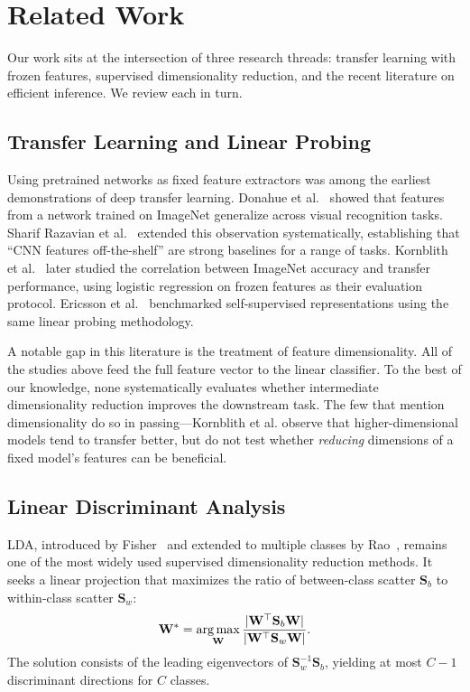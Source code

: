 \section{Related Work}
\label{sec:related_work}

Our work sits at the intersection of three research threads: transfer learning with frozen features, supervised dimensionality reduction, and the recent literature on efficient inference. We review each in turn.

\subsection{Transfer Learning and Linear Probing}

Using pretrained networks as fixed feature extractors was among the earliest demonstrations of deep transfer learning. Donahue et al.~\cite{donahue2014decaf} showed that features from a network trained on ImageNet generalize across visual recognition tasks. Sharif Razavian et al.~\cite{sharif2014cnn} extended this observation systematically, establishing that ``CNN features off-the-shelf'' are strong baselines for a range of tasks. Kornblith et al.~\cite{kornblith2019better} later studied the correlation between ImageNet accuracy and transfer performance, using logistic regression on frozen features as their evaluation protocol. Ericsson et al.~\cite{ericsson2021well} benchmarked self-supervised representations using the same linear probing methodology.

A notable gap in this literature is the treatment of feature dimensionality. All of the studies above feed the full feature vector to the linear classifier. To the best of our knowledge, none systematically evaluates whether intermediate dimensionality reduction improves the downstream task. The few that mention dimensionality do so in passing---Kornblith et al. observe that higher-dimensional models tend to transfer better, but do not test whether \emph{reducing} dimensions of a fixed model's features can be beneficial.

\subsection{Linear Discriminant Analysis}

LDA, introduced by Fisher~\cite{fisher1936lda} and extended to multiple classes by Rao~\cite{rao1948utilization}, remains one of the most widely used supervised dimensionality reduction methods. It seeks a linear projection that maximizes the ratio of between-class scatter $\mathbf{S}_b$ to within-class scatter $\mathbf{S}_w$:
\begin{equation}
\mathbf{W}^* = \operatorname*{arg\,max}_{\mathbf{W}} \frac{|\mathbf{W}^\top \mathbf{S}_b \mathbf{W}|}{|\mathbf{W}^\top \mathbf{S}_w \mathbf{W}|}.
\label{eq:lda_objective}
\end{equation}
The solution consists of the leading eigenvectors of $\mathbf{S}_w^{-1}\mathbf{S}_b$, yielding at most $C-1$ discriminant directions for $C$ classes.

